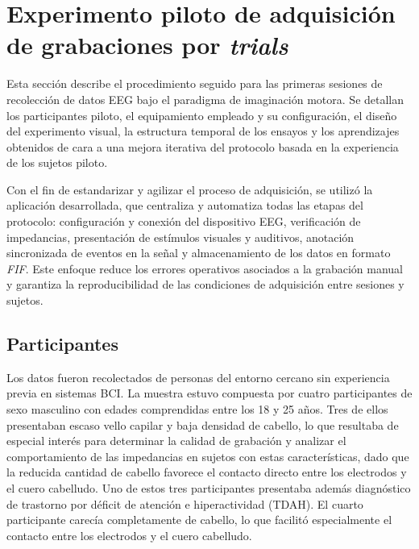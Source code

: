 \section{Experimento piloto de adquisición de grabaciones por \textit{trials}}
\label{sec:experimentoPiloto}

Esta sección describe el procedimiento seguido para las primeras sesiones de recolección de datos EEG bajo el paradigma de imaginación motora. Se detallan los participantes piloto, el equipamiento empleado y su configuración, el diseño del experimento visual, la estructura temporal de los ensayos y los aprendizajes obtenidos de cara a una mejora iterativa del protocolo basada en la experiencia de los sujetos piloto.

Con el fin de estandarizar y agilizar el proceso de adquisición, se utilizó la aplicación desarrollada, que centraliza y automatiza todas las etapas del protocolo: configuración y conexión del dispositivo EEG, verificación de impedancias, presentación de estímulos visuales y auditivos, anotación sincronizada de eventos en la señal y almacenamiento de los datos en formato \textit{FIF}. Este enfoque reduce los errores operativos asociados a la grabación manual y garantiza la reproducibilidad de las condiciones de adquisición entre sesiones y sujetos.

\subsection{Participantes}
\label{subsec:participantes}

Los datos fueron recolectados de personas del entorno cercano sin experiencia previa en sistemas BCI. La muestra estuvo compuesta por cuatro participantes de sexo masculino con edades comprendidas entre los 18 y 25 años. Tres de ellos presentaban escaso vello capilar y baja densidad de cabello, lo que resultaba de especial interés para determinar la calidad de grabación y analizar el comportamiento de las impedancias en sujetos con estas características, dado que la reducida cantidad de cabello favorece el contacto directo entre los electrodos y el cuero cabelludo. Uno de estos tres participantes presentaba además diagnóstico de trastorno por déficit de atención e hiperactividad (TDAH). El cuarto participante carecía completamente de cabello, lo que facilitó especialmente el contacto entre los electrodos y el cuero cabelludo. 

